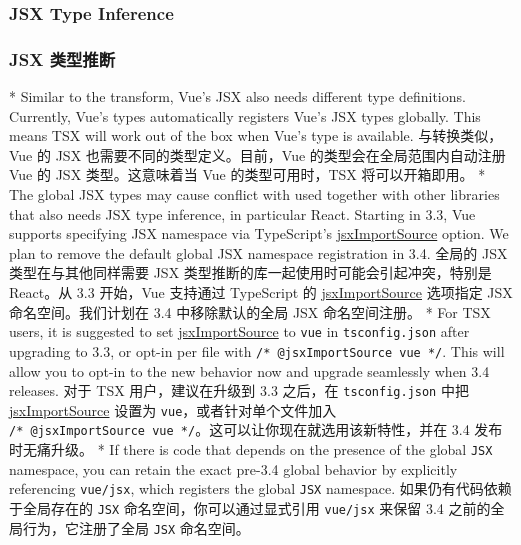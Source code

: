 \begin{paracol}{2}
\subsubsection{JSX Type Inference}
\switchcolumn
\subsubsection{JSX 类型推断}
\switchcolumn[0]*%
Similar to the transform, Vue's JSX also needs different type
definitions. Currently, Vue's types automatically registers Vue's JSX
types globally. This means TSX will work out of the box when Vue's type
is available.
\switchcolumn
与转换类似，Vue 的 JSX 也需要不同的类型定义。目前，Vue
的类型会在全局范围内自动注册 Vue 的 JSX 类型。这意味着当 Vue
的类型可用时，TSX 将可以开箱即用。
\switchcolumn[0]*%
The global JSX types may cause conflict with used together with other
libraries that also needs JSX type inference, in particular React.
Starting in 3.3, Vue supports specifying JSX namespace via TypeScript's
\href{https://www.typescriptlang.org/tsconfig\#jsxImportSource}{jsxImportSource}
option. We plan to remove the default global JSX namespace registration
in 3.4.
\switchcolumn
全局的 JSX 类型在与其他同样需要 JSX
类型推断的库一起使用时可能会引起冲突，特别是 React。从 3.3 开始，Vue
支持通过 TypeScript 的
\href{https://www.typescriptlang.org/tsconfig\#jsxImportSource}{jsxImportSource}
选项指定 JSX 命名空间。我们计划在 3.4 中移除默认的全局 JSX
命名空间注册。
\switchcolumn[0]*%
For TSX users, it is suggested to set
\href{https://www.typescriptlang.org/tsconfig\#jsxImportSource}{jsxImportSource}
to \texttt{\textquotesingle{}vue\textquotesingle{}} in
\texttt{tsconfig.json} after upgrading to 3.3, or opt-in per file with
\texttt{/*\ @jsxImportSource\ vue\ */}. This will allow you to opt-in to
the new behavior now and upgrade seamlessly when 3.4 releases.
\switchcolumn
对于 TSX 用户，建议在升级到 3.3 之后，在 \texttt{tsconfig.json} 中把
\href{https://www.typescriptlang.org/tsconfig\#jsxImportSource}{jsxImportSource}
设置为
\texttt{\textquotesingle{}vue\textquotesingle{}}，或者针对单个文件加入
\texttt{/*\ @jsxImportSource\ vue\ */}。这可以让你现在就选用该新特性，并在
3.4 发布时无痛升级。
\switchcolumn[0]*%
If there is code that depends on the presence of the global \texttt{JSX}
namespace, you can retain the exact pre-3.4 global behavior by
explicitly referencing \texttt{vue/jsx}, which registers the global
\texttt{JSX} namespace.
\switchcolumn
如果仍有代码依赖于全局存在的 \texttt{JSX} 命名空间，你可以通过显式引用
\texttt{vue/jsx} 来保留 3.4 之前的全局行为，它注册了全局 \texttt{JSX}
命名空间。
\end{paracol}



